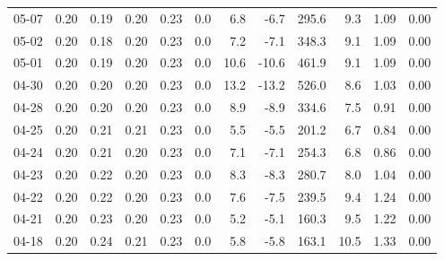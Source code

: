 \begin{threeparttable}
{\begin{tabular}{lrrrrrrrrrrr}
  05-07 &          0.20 &          0.19 &          0.20 &        0.23 &                 0.0 &                 6.8 &       -6.7 &               295.6 &              9.3 &            1.09 &                   0.00 \\
  05-02 &          0.20 &          0.18 &          0.20 &        0.23 &                 0.0 &                 7.2 &       -7.1 &               348.3 &              9.1 &            1.09 &                   0.00 \\
  05-01 &          0.20 &          0.19 &          0.20 &        0.23 &                 0.0 &                10.6 &      -10.6 &               461.9 &              9.1 &            1.09 &                   0.00 \\
  04-30 &          0.20 &          0.20 &          0.20 &        0.23 &                 0.0 &                13.2 &      -13.2 &               526.0 &              8.6 &            1.03 &                   0.00 \\
  04-28 &          0.20 &          0.20 &          0.20 &        0.23 &                 0.0 &                 8.9 &       -8.9 &               334.6 &              7.5 &            0.91 &                   0.00 \\
  04-25 &          0.20 &          0.21 &          0.21 &        0.23 &                 0.0 &                 5.5 &       -5.5 &               201.2 &              6.7 &            0.84 &                   0.00 \\
  04-24 &          0.20 &          0.21 &          0.20 &        0.23 &                 0.0 &                 7.1 &       -7.1 &               254.3 &              6.8 &            0.86 &                   0.00 \\
  04-23 &          0.20 &          0.22 &          0.20 &        0.23 &                 0.0 &                 8.3 &       -8.3 &               280.7 &              8.0 &            1.04 &                   0.00 \\
  04-22 &          0.20 &          0.22 &          0.20 &        0.23 &                 0.0 &                 7.6 &       -7.5 &               239.5 &              9.4 &            1.24 &                   0.00 \\
  04-21 &          0.20 &          0.23 &          0.20 &        0.23 &                 0.0 &                 5.2 &       -5.1 &               160.3 &              9.5 &            1.22 &                   0.00 \\
  04-18 &          0.20 &          0.24 &          0.21 &        0.23 &                 0.0 &                 5.8 &       -5.8 &               163.1 &             10.5 &            1.33 &                   0.00 \\

\end{tabular}}
\end{threeparttable}
